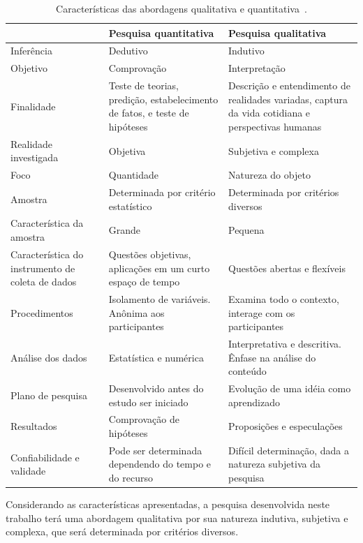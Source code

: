 \newpage
\begin{table}[htb]
\center
\footnotesize
\begin{tabular}{|p{4cm}|p{5cm}|p{5cm}|}
  \hline
   \textbf{} & \textbf{Pesquisa quantitativa}  & \textbf{Pesquisa qualitativa}\\
    \hline
   	Inferência & Dedutivo & Indutivo\\
   \hline    
    	Objetivo & Comprovação & Interpretação\\
   \hline
	Finalidade & Teste de teorias, predição, estabelecimento de fatos, e teste de hipóteses & Descrição e entendimento de realidades variadas, captura da vida cotidiana e perspectivas humanas\\
   \hline
	Realidade investigada & Objetiva & Subjetiva e complexa\\
   \hline
	Foco & Quantidade & Natureza do objeto\\
   \hline
	Amostra & Determinada por critério estatístico & Determinada por critérios diversos\\
   \hline
	Característica da amostra & Grande & Pequena\\
   \hline
	Característica do instrumento de coleta de dados & Questões objetivas, aplicações em um curto espaço de tempo & Questões abertas e flexíveis\\
   \hline
	Procedimentos & Isolamento de variáveis. Anônima aos participantes & Examina todo o contexto, interage com os participantes\\
   \hline
	Análise dos dados & Estatística e numérica & Interpretativa e descritiva. Ênfase na análise do conteúdo\\
   \hline
	Plano de pesquisa & Desenvolvido antes do estudo ser iniciado & Evolução de uma idéia como aprendizado\\
   \hline
	Resultados & Comprovação de hipóteses & Proposições e especulações\\
   \hline
	Confiabilidade e validade & Pode ser determinada dependendo do tempo e do recurso & Difícil determinação, dada a natureza subjetiva da pesquisa\\
   \hline
\end{tabular}
\caption{Características das abordagens qualitativa e quantitativa~\cite{terence2006abordagem}.}
\end{table}

Considerando as características apresentadas, a pesquisa desenvolvida neste trabalho
terá uma abordagem qualitativa por sua natureza indutiva, subjetiva e complexa, que será 
determinada por critérios diversos.

